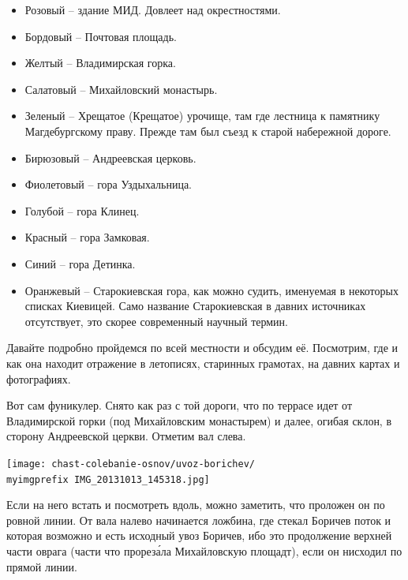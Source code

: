 \begin{itemize}
\item Розовый – здание МИД. Довлеет над окрестностями.

\item Бордовый – Почтовая площадь.

\item Желтый – Владимирская горка.

\item Салатовый – Михайловский монастырь.

\item Зеленый – Хрещатое (Крещатое) урочище, там где лестница к памятнику Магдебургскому праву. Прежде там был съезд к старой набережной дороге.

\item Бирюзовый – Андреевская церковь.

\item Фиолетовый – гора Уздыхальница.

\item Голубой – гора Клинец.

\item Красный – гора Замковая.

\item Синий – гора Детинка.

\item Оранжевый – Старокиевская гора, как можно судить, именуемая в некоторых списках Киевицей. Само название Старокиевская в давних источниках отсутствует, это скорее современный научный термин.
\end{itemize}

Давайте подробно пройдемся по всей местности и обсудим её. Посмотрим, где и как она находит отражение в летописях, старинных грамотах, на давних картах и фотографиях. 

\newpage

Вот сам фуникулер. Снято как раз с той дороги, что по террасе идет от Владимирской горки (под Михайловским монастырем) и далее, огибая склон, в сторону Андреевской церкви. Отметим вал слева. 
\vspace*{\fill}
\begin{center}
\texttt{[image: chast-colebanie-osnov/uvoz-borichev/\\myimgprefix IMG\_20131013\_145318.jpg]}
\end{center}
\vspace*{\fill}
Если на него встать и посмотреть вдоль, можно заметить, что проложен он по ровной линии. От вала налево начинается ложбина, где стекал Боричев поток и которая возможно и есть исходный увоз Боричев, ибо это продолжение верхней части оврага (части что прорез\'ала Михайловскую площадт), если он нисходил по прямой линии.

